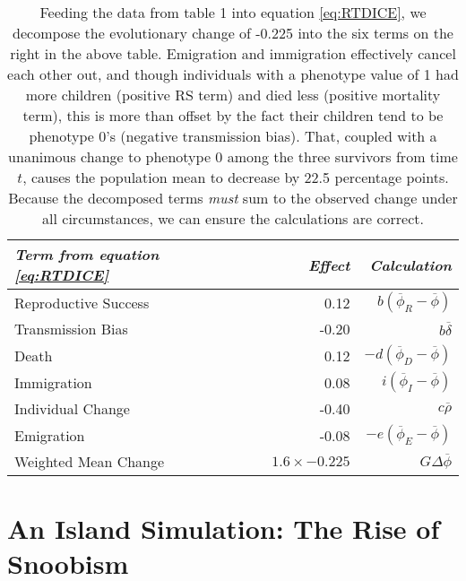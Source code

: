\documentclass[11pt]{article}
\begin{document}
  \begin{table}[htbp]
  \begin{footnotesize}
  \begin{center}
  \begin{tabular}{lrr}
    
  \textit{Term from equation \ref{eq:RTDICE}} & \textit{Effect} & \textit{Calculation}\\
  \hline
  Reproductive Success & 0.12  &  $b(\overline{\phi}_{R} - \overline{\phi})$ \\
  Transmission Bias & -0.20  &  $b\overline{\delta}$ \\
  Death & 0.12  &  $-d(\overline{\phi}_D - \overline{\phi})$ \\
  Immigration & 0.08  &  $i(\overline{\phi}_I - \overline{\phi})$\\
  Individual Change &  -0.40  &  $c\overline{\rho}$ \\
  Emigration & -0.08  &  $-e(\overline{\phi}_E - \overline{\phi})$\\
  \hline
  Weighted Mean Change & $1.6 \times -0.225$ &  $G \Delta \overline{\phi}$\\
  
  \end{tabular}%
  \caption{Feeding the data from table 1 into equation \ref{eq:RTDICE}, we decompose the evolutionary change of -0.225 into the six terms on the right in the above table.  Emigration and immigration effectively cancel each other out, and though individuals with a phenotype value of 1 had more children (positive RS term) and died less (positive mortality term), this is more than offset by the fact their children tend to be phenotype 0's (negative transmission bias).  That, coupled with a unanimous change to phenotype 0 among the three survivors from time $t$, causes the population mean to decrease by 22.5 percentage points.  Because the decomposed terms \textit{must} sum to the observed change under all circumstances, we can ensure the calculations are correct.}
  \label{tab:DemoDecomp}
  \end{center}
  \end{footnotesize}
  \end{table}%
  
  
\section{An Island Simulation: The Rise of Snoobism}
\end{document}
